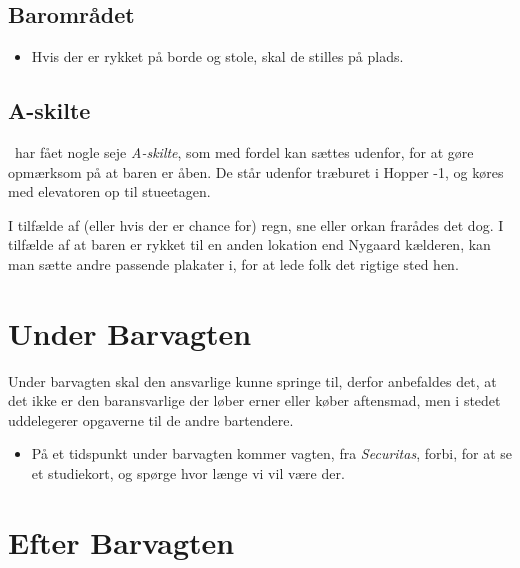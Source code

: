 \subsection{Barområdet}
\label{sec:pre:baromradet}

\begin{itemize}
    \item Hvis der er rykket på borde og stole, skal de stilles på plads.
\end{itemize}

\subsection{A-skilte}
\label{sec:pre:a-skilte}
\fredagscafeen\ har fået nogle seje \textit{A-skilte},
som med fordel kan sættes udenfor,
for at gøre opmærksom på at baren er åben.
De står udenfor træburet i Hopper -1, og
køres med elevatoren op til stueetagen.

I tilfælde af (eller hvis der er chance for) regn, sne eller orkan
frarådes det dog.
I tilfælde af at baren er rykket til en anden lokation end Nygaard kælderen,
kan man sætte andre passende plakater i, for at lede folk det rigtige sted hen.

\section{Under Barvagten}
\label{sec:intra-barvagten}
Under barvagten skal den ansvarlige kunne springe til,
derfor anbefaldes det, at det ikke er den baransvarlige
der løber erner eller køber aftensmad, men i stedet uddelegerer
opgaverne til de andre bartendere.
\begin{itemize}
    \item På et tidspunkt under barvagten kommer vagten, fra \textit{Securitas}, forbi,
    for at se et studiekort, og spørge hvor længe vi vil være der.
\end{itemize}

\section{Efter Barvagten}
\label{sec:post-barvagten}

